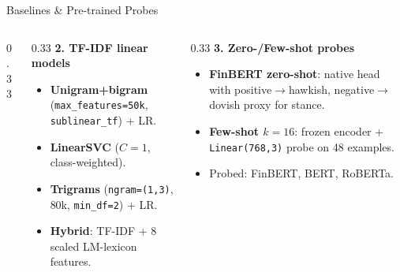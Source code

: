 \documentclass[10pt, aspectratio=169]{beamer}
\begin{document}
\begin{frame}{Baselines \& Pre-trained Probes}
\begin{columns}[T]
\begin{column}{0.33\textwidth}
\begin{itemize}
            \end{itemize}
        \end{column}
        \begin{column}{0.33\textwidth}
            \textbf{2. TF-IDF linear models}
            \begin{itemize}\setlength{\itemsep}{1pt}
                \item \textbf{Unigram+bigram} (\texttt{max\_features=50k}, \texttt{sublinear\_tf}) + LR.
                \item \textbf{LinearSVC} ($C{=}1$, class-weighted).
                \item \textbf{Trigrams} (\texttt{ngram=(1,3)}, 80k, \texttt{min\_df=2}) + LR.
                \item \textbf{Hybrid}: TF-IDF + 8 scaled LM-lexicon features.
            \end{itemize}
        \end{column}
        \begin{column}{0.33\textwidth}
            \textbf{3. Zero-/Few-shot probes}
            \begin{itemize}\setlength{\itemsep}{1pt}
                \item \textbf{FinBERT zero-shot}: native head with positive$\!\to\!$hawkish, negative$\!\to\!$dovish proxy for stance.
                \item \textbf{Few-shot $k{=}16$}: frozen encoder + \texttt{Linear(768,3)} probe on 48 examples.
                \item Probed: FinBERT, BERT, RoBERTa.
            \end{itemize}
        \end{column}
    \end{columns}
\end{frame}
\end{document}
